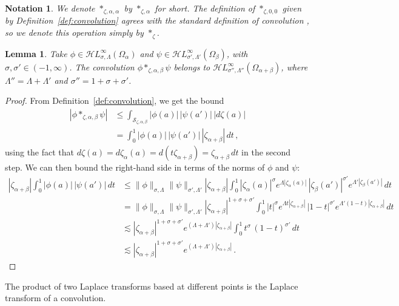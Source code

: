 \documentclass{article}
\newcommand{\singexp}[2]{\mathcal{H}L^\infty_{#1, #2}}
\theoremstyle{definition}
\theoremstyle{plain}
\newtheorem{lemma}[definition]{Lemma}
\newtheorem*{notation*}{Notation}
\begin{document}
\begin{notation*}
We denote $\ast_{\zeta,\alpha,\alpha}$ by $\ast_{\zeta,\alpha}$ for short. The definition of $\ast_{\zeta, 0, 0}$ given by Definition~\ref{def:convolution} agrees with the standard definition of convolution \cite[Definition~5.12]{diverg-resurg-i}, so we denote this operation simply by $\ast_\zeta$.
\end{notation*}
\begin{lemma}
Take $\phi\in\singexp{\sigma}{\Lambda}(\Omega_\alpha)$ and $\psi\in\singexp{\sigma'}{\Lambda'}(\Omega_\beta)$, with $\sigma,\sigma'\in (-1,\infty)$. The convolution $\phi\ast_{\zeta,\alpha,\beta}\psi$ belongs to $\singexp{\sigma''}{\Lambda''}(\Omega_{\alpha+\beta})$, where $\Lambda'' = \Lambda + \Lambda'$ and $\sigma'' = 1+\sigma+\sigma'$.
\end{lemma}    
\begin{proof}
From Definition~\ref{def:convolution}, we get the bound
\begin{align*}
\left|\phi\ast_{\zeta,\alpha,\beta}\psi\right|&\le\int_{\mathcal{S}_{\zeta,\alpha,\beta}} |\phi(a)|\,|\psi(a')|\,|d\zeta(a)| \\
& = \int_0^1|\phi(a)|\,|\psi(a')|\,|\zeta_{\alpha+\beta}|\,dt\,,
\end{align*}
using the fact that $d\zeta(a)=d\zeta_\alpha(a)=d(t\zeta_{\alpha+\beta})=\zeta_{\alpha+\beta}\,dt$ in the second step. We can then bound the right-hand side in terms of the norms of $\phi$ and $\psi$:
\begin{align*}
|\zeta_{\alpha+\beta}|\int_0^1 |\phi(a)|\,|\psi(a')|\,dt &\le \|\phi\|_{\sigma,\Lambda} \|\psi\|_{\sigma',\Lambda'} |\zeta_{\alpha+\beta}|\int_0^1  |\zeta_\alpha(a)|^{\sigma}e^{\Lambda  |\zeta_{\alpha}(a)|}\,|\zeta_\beta(a')|^{\sigma'}e^{\Lambda' |\zeta_{\beta}(a')|}\,dt\\
&= \|\phi\|_{\sigma,\Lambda} \|\psi\|_{\sigma',\Lambda'} |\zeta_{\alpha+\beta}|^{1+\sigma+\sigma'}\int_0^1  |t|^{\sigma}e^{\Lambda t |\zeta_{\alpha+\beta}|}\,|1-t|^{\sigma'}e^{\Lambda' (1-t)|\zeta_{\alpha+\beta}|}\,dt\\
&\lesssim |\zeta_{\alpha+\beta}| ^{1+\sigma+\sigma'} e^{(\Lambda+\Lambda')|\zeta_{\alpha+\beta}|}\int_0^1  t^{\sigma}\,(1-t)^{\sigma'}\,dt\\
&\lesssim |\zeta_{\alpha+\beta}| ^{1+\sigma+\sigma'} e^{(\Lambda+\Lambda')|\zeta_{\alpha+\beta}|}\,.
\end{align*}
\end{proof}
The product of two Laplace transforms based at different points is the Laplace transform of a convolution.
\end{document}
